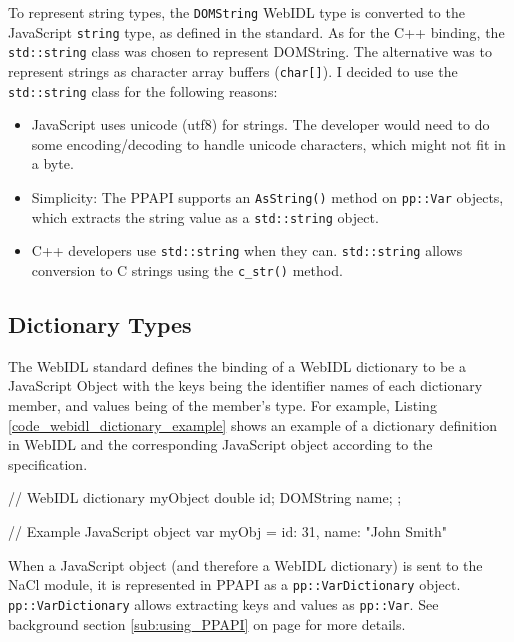To represent string types, the \lstinline{DOMString} WebIDL type is converted to the JavaScript \lstinline{string} type, as defined in the standard. As for the C++ binding, the \lstinline{std::string} class was chosen to represent DOMString. The alternative was to represent strings as character array buffers (\lstinline{char[]}). I decided to use the \lstinline{std::string} class for the following reasons:

\begin{itemize}
	\item JavaScript uses unicode (utf8) for strings. The developer would need to do some encoding/decoding to handle unicode characters, which might not fit in a byte.
	\item Simplicity: The PPAPI supports an \lstinline{AsString()} method on \lstinline{pp::Var} objects, which extracts the string value as a \lstinline{std::string} object.
	\item C++ developers use \lstinline{std::string} when they can. \lstinline{std::string} allows conversion to C strings using the \lstinline{c_str()} method.
\end{itemize}


\subsection{Dictionary Types} %
\label{sub:dictionary_types}
The WebIDL standard defines the binding of a WebIDL dictionary to be a JavaScript Object with the keys being the identifier names of each dictionary member, and values being of the member's type. For example, Listing \ref{code_webidl_dictionary_example} shows an example of a dictionary definition in WebIDL and the corresponding JavaScript object according to the specification.

\begin{code}
// WebIDL
dictionary myObject {
  double id;
  DOMString name;
};

// Example JavaScript object
var myObj = {
  id: 31,
  name: "John Smith"
}
\end{code}

When a JavaScript object (and therefore a WebIDL dictionary) is sent to the NaCl module, it is represented in PPAPI as a \lstinline{pp::VarDictionary} object. \lstinline{pp::VarDictionary} allows extracting keys and values as \lstinline{pp::Var}. See background section \ref{sub:using_PPAPI} on page \pageref{sub:using_PPAPI} for more details.

